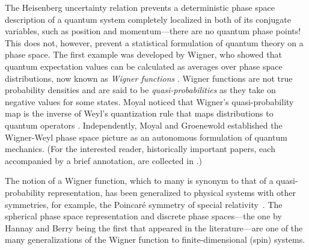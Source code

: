 The Heisenberg uncertainty relation prevents a deterministic phase space description of a quantum system completely localized in both of its conjugate variables, such as position and momentum---there are no quantum phase points!
This does not, however, prevent a statistical formulation of quantum theory on a phase space. The first example was developed by Wigner, who showed that quantum expectation values can be calculated as averages over phase space distributions, now known as \emph{Wigner functions} \cite{wigner_quantum_1932}. Wigner functions are not true probability densities and are said to be \emph{quasi-probabilities} as they take on negative values for some states. Moyal \cite{moyal_quantum_1949} noticed that Wigner's quasi-probability map is the inverse of Weyl's quantization rule that maps distributions to quantum operators \cite{weyl_quantenmechanik_1927}. Independently, Moyal and Groenewold \cite{groenewold_principles_1946} established the Wigner-Weyl phase space picture as an autonomous formulation of quantum mechanics. (For the interested reader, historically important papers, each accompanied by a brief annotation, are collected in \cite{zachos2005quantum}.) 

The notion of a Wigner function, which to many is synonym to that of a quasi-probability representation, has been generalized to physical systems with other symmetries, for example, the Poincar{\'e} symmetry of special relativity~\cite{kim1991phase,schroeck1996quantum}. The spherical phase space representation \cite{stratonovich_distributions_1957} and discrete phase spaces---the one by Hannay and Berry \cite{hannay_quantization_1980} being the first that appeared in the literature---are one of the many generalizations \cite{ferrie_quasi-probability_2011} of the Wigner function to finite-dimensional (spin) systems.



